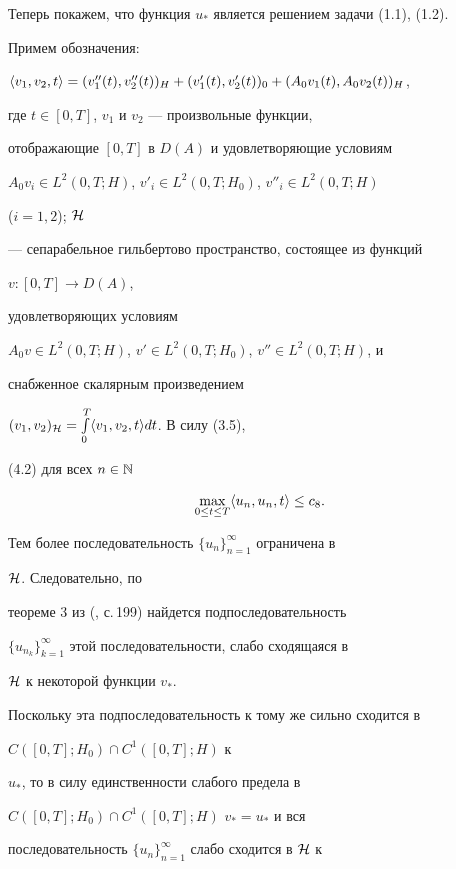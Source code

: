 \begin{pf}
 


Теперь покажем, что функция $u_*$ является решением задачи (1.1), (1.2). 


Примем обозначения: 


$\la v_1,v_2,t\ra=(v''_1(t),v''_2(t))_H+(v'_1(t),v'_2(t))_0+ 


(A_0v_1(t),A_0v_2(t))_H$, 


где $t\in[0,T]$, $v_1$ и $v_2$ --- произвольные функции, 


отображающие $[0,T]$ в $D(A)$ и удовлетворяющие условиям 


$A_0v_i\in L^2(0,T;H)$, $v'_i\in L^2(0,T;H_0)$, $v''_i\in L^2(0,T;H)$ 


($i=1,2$); $\cal H$ 


--- сепарабельное гильбертово пространство, состоящее из функций 


$v:[0,T]\to D(A)$, 


удовлетворяющих условиям 


$A_0v\in L^2(0,T;H)$, $v'\in L^2(0,T;H_0)$, $v''\in L^2(0,T;H)$, и 


снабженное скалярным произведением 


$(v_1,v_2)_{\cal H}=\int\limits^T_0\langle v_1,v_2,t\rangle dt$. В силу (3.5), 


(4.2) для всех $n\in\Bbb N$ 


\begin{equation} 


\max_{0\le t\le T}\la u_n,u_n,t\ra\le c_8. 


\end{equation} 


Тем более последовательность $\{u_n\}^\infty_{n=1}$ ограничена в 


$\cal H$. Следовательно, по 


теореме 3 из (\cite{14}, с.\,199) найдется подпоследовательность 


$\{u_{n_k}\}^\infty_{k=1}$ этой последовательности, слабо сходящаяся в 


$\cal H$ к некоторой функции $v_*$. 


Поскольку эта подпоследовательность к тому же сильно сходится в 


$C([0,T];H_0)\cap C^1([0,T];H)$ к 


$u_*$, то в силу единственности слабого предела в 


$C([0,T];H_0)\cap C^1([0,T];H)$\; $v_*=u_*$ и вся 


последовательность $\{u_n\}^\infty_{n=1}$ слабо сходится в $\cal H$ к 



\end{pf}
